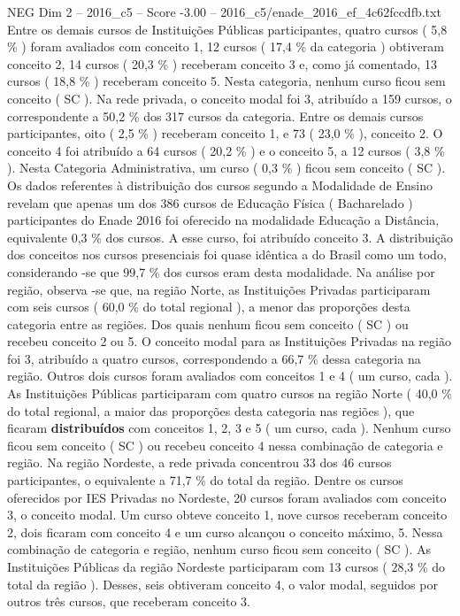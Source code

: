 \begin{textsample}{NEG Dim 2 – 2016\_c5 – Score -3.00 – 2016\_c5/enade\_2016\_ef\_4c62fccdfb.txt}
Entre os demais cursos de Instituições Públicas participantes, quatro cursos ( 5,8 \% ) foram avaliados com conceito 1, 12 cursos ( 17,4 \% da categoria ) obtiveram conceito 2, 14 cursos ( 20,3 \% ) receberam conceito 3 e, como já comentado, 13 cursos ( 18,8 \% ) receberam conceito 5.
Nesta categoria, nenhum curso ficou sem conceito ( SC ).
Na rede privada, o conceito modal foi 3, atribuído a 159 cursos, o correspondente a 50,2 \% dos 317 cursos da categoria.
Entre os demais cursos participantes, oito ( 2,5 \% ) receberam conceito 1, e 73 ( 23,0 \% ), conceito 2.
O conceito 4 foi atribuído a 64 cursos ( 20,2 \% ) e o conceito 5, a 12 cursos ( 3,8 \% ).
Nesta Categoria Administrativa, um curso ( 0,3 \% ) ficou sem conceito ( SC ).
Os dados referentes à distribuição dos cursos segundo a Modalidade de Ensino revelam que apenas um dos 386 cursos de Educação Física ( Bacharelado ) participantes do Enade 2016 foi oferecido na modalidade Educação a Distância, equivalente 0,3 \% dos cursos.
A esse curso, foi atribuído conceito 3.
A distribuição dos conceitos nos cursos presenciais foi quase idêntica a do Brasil como um todo, considerando -se que 99,7 \% dos cursos eram desta modalidade.
Na análise por região, observa -se que, na região Norte, as Instituições Privadas participaram com seis cursos ( 60,0 \% do total regional ), a menor das proporções desta categoria entre as regiões.
Dos quais nenhum ficou sem conceito ( SC ) ou recebeu conceito 2 ou 5.
O conceito modal para as Instituições Privadas na região foi 3, atribuído a quatro cursos, correspondendo a 66,7 \% dessa categoria na região.
Outros dois cursos foram avaliados com conceitos 1 e 4 ( um curso, cada ).
As Instituições Públicas participaram com quatro cursos na região Norte ( 40,0 \% do total regional, a maior das proporções desta categoria nas regiões ), que ficaram \textbf{distribuídos} com conceitos 1, 2, 3 e 5 ( um curso, cada ).
Nenhum curso ficou sem conceito ( SC ) ou recebeu conceito 4 nessa combinação de categoria e região.
Na região Nordeste, a rede privada concentrou 33 dos 46 cursos participantes, o equivalente a 71,7 \% do total da região.
Dentre os cursos oferecidos por IES Privadas no Nordeste, 20 cursos foram avaliados com conceito 3, o conceito modal.
Um curso obteve conceito 1, nove cursos receberam conceito 2, dois ficaram com conceito 4 e um curso alcançou o conceito máximo, 5.
Nessa combinação de categoria e região, nenhum curso ficou sem conceito ( SC ).
As Instituições Públicas da região Nordeste participaram com 13 cursos ( 28,3 \% do total da região ).
Desses, seis obtiveram conceito 4, o valor modal, seguidos por outros três cursos, que receberam conceito 3.

\end{textsample}
